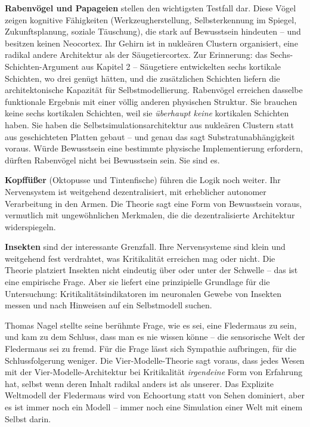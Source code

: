 \documentclass[11pt, twoside, openright]{book}
\begin{document}
\textbf{Rabenvögel und Papageien} stellen den wichtigsten Testfall dar. Diese Vögel zeigen kognitive Fähigkeiten (Werkzeugherstellung, Selbsterkennung im Spiegel, Zukunftsplanung, soziale Täuschung), die stark auf Bewusstsein hindeuten -- und besitzen keinen Neocortex. Ihr Gehirn ist in nukleären Clustern organisiert, eine radikal andere Architektur als der Säugetiercortex. Zur Erinnerung: das Sechs-Schichten-Argument aus Kapitel 2 -- Säugetiere entwickelten sechs kortikale Schichten, wo drei genügt hätten, und die zusätzlichen Schichten liefern die architektonische Kapazität für Selbstmodellierung. Rabenvögel erreichen dasselbe funktionale Ergebnis mit einer völlig anderen physischen Struktur. Sie brauchen keine sechs kortikalen Schichten, weil sie \textit{überhaupt keine} kortikalen Schichten haben. Sie haben die Selbstsimulationsarchitektur aus nukleären Clustern statt aus geschichteten Platten gebaut -- und genau das sagt Substratunabhängigkeit voraus. Würde Bewusstsein eine bestimmte physische Implementierung erfordern, dürften Rabenvögel nicht bei Bewusstsein sein. Sie sind es.

\textbf{Kopffüßer} (Oktopusse und Tintenfische) führen die Logik noch weiter. Ihr Nervensystem ist weitgehend dezentralisiert, mit erheblicher autonomer Verarbeitung in den Armen. Die Theorie sagt eine Form von Bewusstsein voraus, vermutlich mit ungewöhnlichen Merkmalen, die die dezentralisierte Architektur widerspiegeln.

\textbf{Insekten} sind der interessante Grenzfall. Ihre Nervensysteme sind klein und weitgehend fest verdrahtet, was Kritikalität erreichen mag oder nicht. Die Theorie platziert Insekten nicht eindeutig über oder unter der Schwelle -- das ist eine empirische Frage. Aber sie liefert eine prinzipielle Grundlage für die Untersuchung: Kritikalitätsindikatoren im neuronalen Gewebe von Insekten messen und nach Hinweisen auf ein Selbstmodell suchen.

Thomas Nagel stellte seine berühmte Frage, wie es sei, eine Fledermaus zu sein, und kam zu dem Schluss, dass man es nie wissen könne -- die sensorische Welt der Fledermaus sei zu fremd. Für die Frage lässt sich Sympathie aufbringen, für die Schlussfolgerung weniger. Die Vier-Modelle-Theorie sagt voraus, dass jedes Wesen mit der Vier-Modelle-Architektur bei Kritikalität \textit{irgendeine} Form von Erfahrung hat, selbst wenn deren Inhalt radikal anders ist als unserer. Das Explizite Weltmodell der Fledermaus wird von Echoortung statt von Sehen dominiert, aber es ist immer noch ein Modell -- immer noch eine Simulation einer Welt mit einem Selbst darin.
\end{document}
